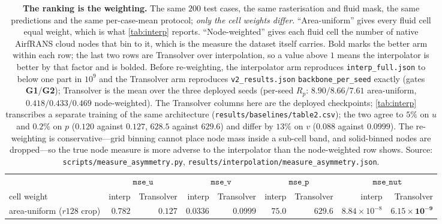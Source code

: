 \begin{table}[t]
\centering
\small
\caption{\textbf{The ranking is the weighting.} The same $200$ test cases, the same
rasterisation and fluid mask, the same predictions and the same per-case-mean protocol;
\emph{only the cell weights differ}. ``Area-uniform'' gives every fluid cell equal weight,
which is what \autoref{tab:interp} reports. ``Node-weighted'' gives each fluid cell the
number of native AirfRANS cloud nodes that bin to it, which is the measure the dataset
itself carries. Bold marks the better arm within each row; the last two rows are
Transolver over interpolation, so a value above $1$ means the interpolator is better by
that factor and is bolded. Before re-weighting, the interpolator arm reproduces
\texttt{interp\_full.json} to below one part in $10^{9}$ and the Transolver arm reproduces
\texttt{v2\_results.json} \texttt{backbone\_per\_seed} exactly
(gates \textbf{G1}/\textbf{G2}); Transolver is the mean over the three deployed seeds
(per-seed $R_p$: $8.90/8.66/7.61$ area-uniform, $0.418/0.433/0.469$ node-weighted). The
Transolver columns here are the deployed checkpoints; \autoref{tab:interp} transcribes a
separate training of the same architecture (\texttt{results\slash{}baselines\slash{}table2.csv}); the
two agree to $5\%$ on $u$ and $0.2\%$ on $p$ ($0.120$ against $0.127$, $628.5$ against
$629.6$) and differ by $13\%$ on $v$ ($0.088$ against $0.0999$). The re-weighting is conservative---grid binning cannot place
node mass inside a sub-cell band, and solid-binned nodes are dropped---so the true node
measure is more adverse to the interpolator than the node-weighted row shows. Source:
\texttt{scripts\slash{}measure\_asymmetry.py},
\texttt{results\slash{}interpolation\slash{}measure\_asymmetry.json}.}
\label{tab:measure}
\begin{adjustbox}{max width=\textwidth}
\begin{tabular}{l r r r r r r r r}
\toprule
 & \multicolumn{2}{c}{$\texttt{mse\_u}$} & \multicolumn{2}{c}{$\texttt{mse\_v}$} & \multicolumn{2}{c}{$\texttt{mse\_p}$} & \multicolumn{2}{c}{$\texttt{mse\_nut}$} \\
\cmidrule(lr){2-3}\cmidrule(lr){4-5}\cmidrule(lr){6-7}\cmidrule(lr){8-9}
cell weight & interp & Transolver & interp & Transolver & interp & Transolver & interp & Transolver \\
\midrule
area-uniform ($r128$ crop) & $0.782$ & $\mathbf{0.127}$ & $\mathbf{0.0336}$ & $0.0999$ & $\mathbf{75.0}$ & $629.6$ & $8.84{\times}10^{-8}$ & $\mathbf{6.15{\times}10^{-9}}$ \\

\end{tabular}
\end{adjustbox}
\end{table}
